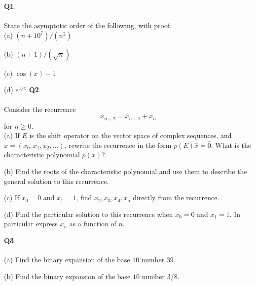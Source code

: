 \documentclass[12pt, oneside]{amsart}
\begin{document}
\vfill


\newpage
\noindent
\textbf{Q1}. \\ \\ 
State the asymptotic order of the following, with proof.  
\\

\noindent
(a) $(n+10^7)/(n^2)$ 

\vspace{2in}

\noindent
(b) $(n+1)/(\sqrt{n})$ 

\vspace{2in}

\noindent
(c) $\cos(x)-1$ 

\vspace{2in}

\noindent
(d) $e^{1/x}$ 
\newpage
\noindent
\textbf{Q2}.\\ \\ 
Consider the recurrence 
$$
x_{n+2}=x_{n+1}+x_n
$$
for $n \geq 0$. \\

\noindent
(a) If $E$ is the shift operator on the vector space of complex sequences, and $\hat{x}=(x_0,x_1,x_2,\dots)$, rewrite the recurrence in the form 
$p(E)\hat{x}=\hat{0}$. What is the characteristic polynomial $p(x)$? 

\vspace{1.5 in}

\noindent
(b) Find the roots of the characteristic polynomial and use them to describe the general solution to this recurrence. 

\vspace{1.5in}

\noindent
(c) If $x_0=0$ and $x_1=1$, find $x_2, x_3, x_4, x_5$ directly from the recurrence. \\

\vspace{1.5in}

\noindent
(d) Find the particular solution to this recurrence when $x_0=0$ and $x_1=1$. In particular express $x_n$ as a function of $n$.

\newpage
\noindent
\textbf{Q3}. \\ \\ 

\noindent
(a) Find the binary expansion of the base $10$ number $39$.

\vspace{2in}

\noindent
(b) Find the binary expansion of the base $10$ number $3/8$. 
\end{document}
